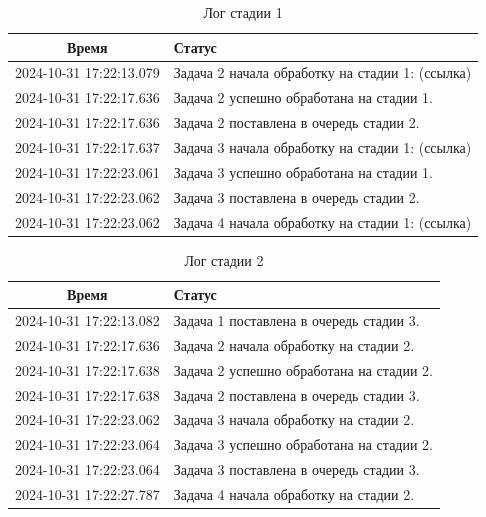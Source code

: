 \begin{table}[h!]
\begin{center}
\begin{threeparttable}
\caption{Лог стадии 1}
\captionsetup{justification=raggedright, singlelinecheck=false}
\label{2-tb}
\begin{tabular}{|c|p{10cm}|}
    \hline
    \textbf{Время} & \textbf{Статус} \\
    \hline
    2024-10-31 17:22:13.079 & Задача 2 начала обработку на стадии 1: (ссылка) \\
    2024-10-31 17:22:17.636 & Задача 2 успешно обработана на стадии 1. \\
    2024-10-31 17:22:17.636 & Задача 2 поставлена в очередь стадии 2. \\
    2024-10-31 17:22:17.637 & Задача 3 начала обработку на стадии 1: (ссылка) \\
    2024-10-31 17:22:23.061 & Задача 3 успешно обработана на стадии 1. \\
    2024-10-31 17:22:23.062 & Задача 3 поставлена в очередь стадии 2. \\
    2024-10-31 17:22:23.062 & Задача 4 начала обработку на стадии 1: (ссылка) \\
    \hline
\end{tabular}
\end{threeparttable}
\end{center}
\end{table}

\begin{table}[h!]
\begin{center}
\begin{threeparttable}
\caption{Лог стадии 2}
\captionsetup{justification=raggedright, singlelinecheck=false}
\label{3-tb}
\begin{tabular}{|c|p{10cm}|}
    \hline
    \textbf{Время} & \textbf{Статус} \\
    \hline
    2024-10-31 17:22:13.082 & Задача 1 поставлена в очередь стадии 3. \\
    2024-10-31 17:22:17.636 & Задача 2 начала обработку на стадии 2. \\
    2024-10-31 17:22:17.638 & Задача 2 успешно обработана на стадии 2. \\
    2024-10-31 17:22:17.638 & Задача 2 поставлена в очередь стадии 3. \\
    2024-10-31 17:22:23.062 & Задача 3 начала обработку на стадии 2. \\
    2024-10-31 17:22:23.064 & Задача 3 успешно обработана на стадии 2. \\
    2024-10-31 17:22:23.064 & Задача 3 поставлена в очередь стадии 3. \\
    2024-10-31 17:22:27.787 & Задача 4 начала обработку на стадии 2. \\
    \hline
\end{tabular}
\end{threeparttable}
\end{center}
\end{table}

